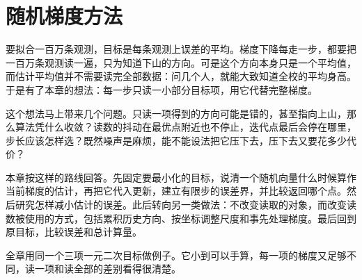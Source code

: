\chapter{随机梯度方法}
\label{chap:stochastic-gradient-methods}

要拟合一百万条观测，目标是每条观测上误差的平均。梯度下降每走一步，都要把一百万条观测读一遍，只为知道下山的方向。可是这个方向本身只是一个平均值，而估计平均值并不需要读完全部数据：问几个人，就能大致知道全校的平均身高。于是有了本章的想法：每一步只读一小部分目标项，用它代替完整梯度。

这个想法马上带来几个问题。只读一项得到的方向可能是错的，甚至指向上山，那么算法凭什么收敛？读数的抖动在最优点附近也不停止，迭代点最后会停在哪里，步长应该怎样选？既然噪声是麻烦，能不能设法把它压下去，压下去又要花多少代价？

本章按这样的路线回答。先固定要最小化的目标，说清一个随机向量什么时候算作当前梯度的估计，再把它代入更新，建立有限步的误差界，并比较返回哪个点。然后研究怎样减小估计的误差。此后转向另一类做法：不改变读取的对象，而改变读数被使用的方式，包括累积历史方向、按坐标调整尺度和事先处理梯度。最后回到原目标，比较误差和总计算量。

全章用同一个三项一元二次目标做例子。它小到可以手算，每一项的梯度又足够不同，读一项和读全部的差别看得很清楚。









